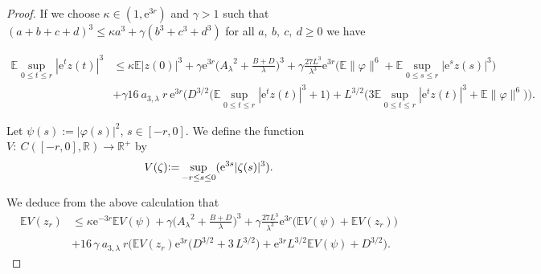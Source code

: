 \documentclass[11pt,reqno,draft]{amsart}
\begin{document}
\begin{proof}
\noindent If we choose $\kappa\in (1,{\mathrm{e}}^{3r})$ and
$\gamma>1$ such that $(a+b+c+d)^3\leq \kappa
a^3+\gamma (b^3+ c^3+ d^3)$ for all $a,\:b,\:c,\:d\geq 0$
we have

\begin{equation*}
\begin{split}
{\mathbb E}\sup\limits_{0\leq t\leq r}|{\mathrm{e}}^tz(t)|^3&\leq \kappa
{\mathbb E}|z(0)|^3+\gamma
{\mathrm{e}}^{3r}\Big({A_{\lambda}}^2+\frac{B+D}{\lambda}\Big)^3+\gamma\frac{27L^3}{\lambda^3}{\mathrm{e}}^{3r}\big({\mathbb E} \|\varphi\|^6 + {\mathbb E}\sup\limits_{0\leq
s\leq r}|{\mathrm{e}}^s z(s)|^3\big)\\&+\gamma 16\:a_{3,\lambda}\: r\:{\mathrm{e}}^{3r}
\Big( D^{3/2} \big({\mathbb E}\sup\limits_{0\leq t\leq r}|{\mathrm{e}}^{t}z(t)|^3+1\big)
+ L^{3/2} \big(3{\mathbb E}\sup\limits_{0\leq t\leq r}|{\mathrm{e}}^{t}z(t)|^3 + {\mathbb E}\|\varphi\|^6\big)\Big).
\end{split}
\end{equation*}

\noindent Let $\psi(s):=|\varphi(s)|^2$, $s \in [-r,0]$. We define the function $V:\:C([-r,0],{\mathbb R})\rightarrow
{\mathbb R}^+$ by  $$V(\zeta){\mathrel{\mathrm{\raise0.1ex\hbox{:}\hbox{=}\strut}}} \sup\limits_{-r\leq s\leq
0}({\mathrm{e}}^{3s}|\zeta(s)|^3). $$

\noindent We deduce from the above calculation that
\begin{equation}
\begin{split}
{\mathbb E} V(z_r)&\leq \kappa {\mathrm{e}}^{-3r} {\mathbb E} V(\psi)+\gamma
\Big({A_{\lambda}}^2+\frac{B+D}{\lambda}\Big)^3+\gamma\frac{27L^3}{\lambda^3}{\mathrm{e}}^{3r}\big({\mathbb E}
V(\psi)+{\mathbb E} V(z_r)\big)\\&+16\,\gamma\:a_{3,\lambda}\: r \Big({\mathbb E} V(z_r) {\mathrm{e}}^{3r}\big( D^{3/2}+3\,L^{3/2}\big) +  {\mathrm{e}}^{3r}L^{3/2}{\mathbb E} V(\psi)+
D^{3/2}\Big).
\end{split}
\end{equation}


\end{proof}
\end{document}
